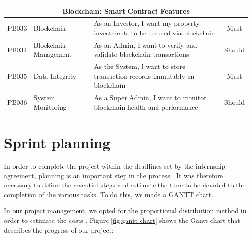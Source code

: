 \begin{longtable}{|c|l|p{8cm}|c|}
    \multicolumn{4}{|c|}{\cellcolor{primary!15}\textbf{\textcolor{primary}{Blockchain: Smart Contract Features}}} \\
    \hline
    PB033 & Blockchain & As an Investor, I want my property investments to be secured via blockchain \cite{McKinseyBlockchainRE2023} & Must \\
    \hline
    PB034 & Blockchain Management & As an Admin, I want to verify and validate blockchain transactions & Should \\
    \hline
    PB035 & Data Integrity & As the System, I want to store transaction records immutably on blockchain & Must \\
    \hline
    PB036 & System Monitoring & As a Super Admin, I want to monitor blockchain health and performance & Should \\
    \hline
\end{longtable}

\section{Sprint planning}

In order to complete the project within the deadlines set by the internship agreement, planning is an important step in the process \cite{SutherlandScrum2020, RubinEssentialScrum2012}. It was therefore necessary to define the essential steps and estimate the time to be devoted to the completion of the various tasks. To do this, we made a GANTT chart.

In our project management, we opted for the proportional distribution method in order to estimate the costs \cite{CohnAgileEstimating2005, GreningPlanningPoker2002}.
Figure \ref{fig:gantt-chart} shows the Gantt chart that describes the progress of our project:

